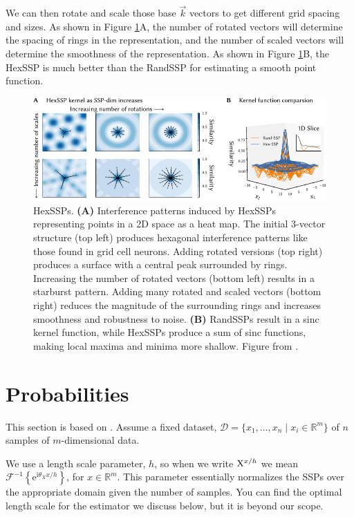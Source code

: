 \documentclass[10pt,letterpaper,oneside]{article}
\newcommand{\ssp}[1]{\mathrm{\uppercase{#1}}^{\lowercase{#1}/h}}
\begin{document}
We can then rotate and scale those base $\vec{k}$ vectors to get different grid spacing and sizes. As shown in Figure \ref{fig:SSP_kernels.pdf}A, the number of rotated vectors will determine the spacing of rings in the representation, and the number of scaled vectors will determine the smoothness of the representation. As shown in Figure \ref{fig:SSP_kernels.pdf}B, the HexSSP is much better than the RandSSP for estimating a smooth point function.

\begin{figure}
  \centering
  \includegraphics[width=\linewidth]{media/SSP_kernels.pdf}
  \caption{HexSSPs. \textbf{(A)} Interference patterns induced by HexSSPs representing points in a 2D space as a heat map. The initial 3-vector structure (top left) produces hexagonal interference patterns like those found in grid cell neurons.  Adding rotated versions (top right) produces a surface with a central peak surrounded by rings.  Increasing the number of rotated vectors (bottom left) results in a starburst pattern. Adding many rotated and scaled vectors (bottom right) reduces the magnitude of the surrounding rings and increases smoothness and robustness to noise. \textbf{(B)} RandSSPs result in a sinc kernel function, while HexSSPs produce a sum of sinc functions, making local maxima and minima more shallow. Figure from \cite{furlong2024bo}.}
  \label{fig:SSP_kernels.pdf}
\end{figure}


\section{Probabilities}

This section is based on \cite{furlong2022fractional}. Assume a fixed dataset, $\mathcal{D} = \{x_{1},\ldots,x_{n}\mid x_{i} \in \mathbb{R}^{m}\}$ of $n$ samples of $m$-dimensional data. 

We use a length scale parameter, $h$, so when we write $\ssp{x}$ we mean $\mathcal{F}^{-1}\left\{\mathrm{e}^{\mathrm{i}\theta_{X}x/h}\right\}$, for $x \in \mathbb{R}^{m}$. This parameter essentially normalizes the SSPs over the appropriate domain given the number of samples. You can find the optimal length scale for the estimator we discuss below, but it is beyond our scope.
\end{document}
